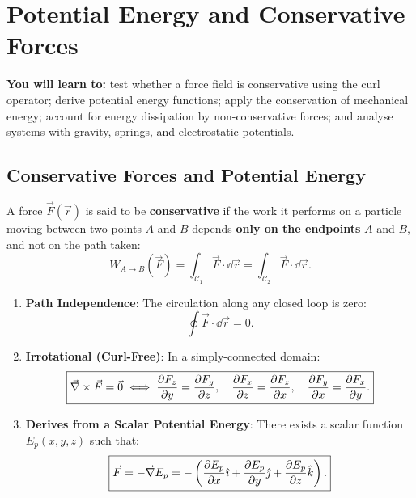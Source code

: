 \chapter{Potential Energy and Conservative Forces}
\label{ch:potential_energy}
\begin{chapterintro}
\textbf{You will learn to:} test whether a force field is conservative using the curl operator; derive potential energy functions; apply the conservation of mechanical energy; account for energy dissipation by non-conservative forces; and analyse systems with gravity, springs, and electrostatic potentials.
\end{chapterintro}

\section{Conservative Forces and Potential Energy}

A force $\vec{F}(\vec{r})$ is said to be \textbf{conservative} if the work it performs on a particle moving between two points $A$ and $B$ depends \textbf{only on the endpoints} $A$ and $B$, and not on the path taken:
\[
W_{A\to B}(\vec{F}) = \int_{\mathcal{C}_1} \vec{F}\cdot\dd\vec{r} = \int_{\mathcal{C}_2} \vec{F}\cdot\dd\vec{r}.
\]

\begin{keyidea}
\begin{enumerate}[leftmargin=1.5em,itemsep=3pt]
  \item \textbf{Path Independence}: The circulation along any closed loop is zero:
        \[
        \oint \vec{F}\cdot\dd\vec{r} = 0.
        \]
  \item \textbf{Irrotational (Curl-Free)}: In a simply-connected domain:
        \[
        \boxed{\vec{\nabla}\times\vec{F} = \vec{0} \iff \frac{\partial F_z}{\partial y} = \frac{\partial F_y}{\partial z},\quad \frac{\partial F_x}{\partial z} = \frac{\partial F_z}{\partial x},\quad \frac{\partial F_y}{\partial x} = \frac{\partial F_x}{\partial y}.}
        \]
  \item \textbf{Derives from a Scalar Potential Energy}: There exists a scalar function $E_p(x, y, z)$ such that:
        \[
        \boxed{\vec{F} = -\vec{\nabla} E_p = -\left(\frac{\partial E_p}{\partial x}\hat{\imath} + \frac{\partial E_p}{\partial y}\hat{\jmath} + \frac{\partial E_p}{\partial z}\hat{k}\right).}
        \]
\end{enumerate}
\end{keyidea}

